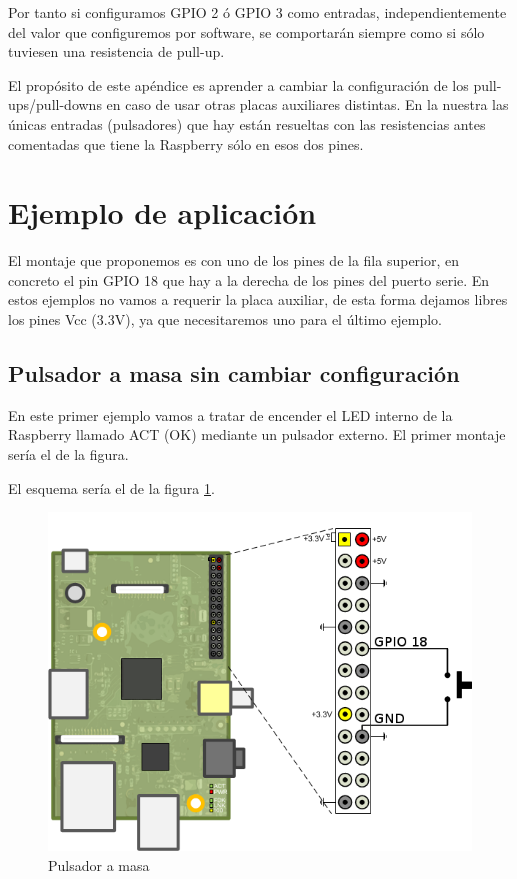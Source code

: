 Por tanto si configuramos GPIO 2 ó GPIO 3 como entradas, independientemente del valor
que configuremos por software, se comportarán siempre como si sólo tuviesen una
resistencia de pull-up.

El propósito de este apéndice es aprender a cambiar la configuración de los pull-ups/pull-downs
en caso de usar otras placas auxiliares distintas. En la nuestra las únicas entradas (pulsadores)
que hay están resueltas con las resistencias antes comentadas que tiene la Raspberry sólo en
esos dos pines.

\section{Ejemplo de aplicación}

El montaje que proponemos es con uno de los pines de la fila superior, en concreto el
pin GPIO 18 que hay a la derecha de los pines del puerto serie. En estos ejemplos
no vamos a requerir la placa auxiliar, de esta forma
dejamos libres los pines Vcc (3.3V), ya que necesitaremos uno para el último ejemplo. 

\subsection{Pulsador a masa sin cambiar configuración}

En este primer ejemplo vamos a tratar de encender el LED interno de la Raspberry llamado
ACT (OK) mediante un pulsador externo. El primer montaje sería el de
la figura.

El esquema sería el de la figura \ref{fig:circuito1}.

\begin{figure}[h]
  \centering
    \includegraphics[width=14cm]{graphs/circuito1.png}
  \caption{Pulsador a masa}
  \label{fig:circuito1}
\end{figure}

